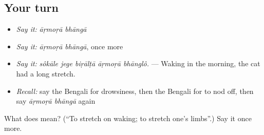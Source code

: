 \subsection*{Your turn}
\begin{itemize}
\raggedright
  \item \emph{Say it:} \emph{āṛmoṛā bhāngā}
  \item \emph{Say it:} \emph{āṛmoṛā bhāngā}, once more
  \item \emph{Say it:} \emph{sôkāle jege biṛālṭā āṛmoṛā bhānglô.} — Waking in the morning, the cat had a long stretch.
  \item \emph{Recall:} say the Bengali for drowsiness, then the Bengali for to nod off, then say \emph{āṛmoṛā bhāngā} again
\end{itemize}

\begin{tcolorbox}[breakable,colback=teal!4,colframe=teal!35!black,title={Before you move on}]
What does   mean? (\textquotedblleft{}To stretch on waking; to stretch one's limbs\textquotedblright{}.) Say it once more.
\end{tcolorbox}
